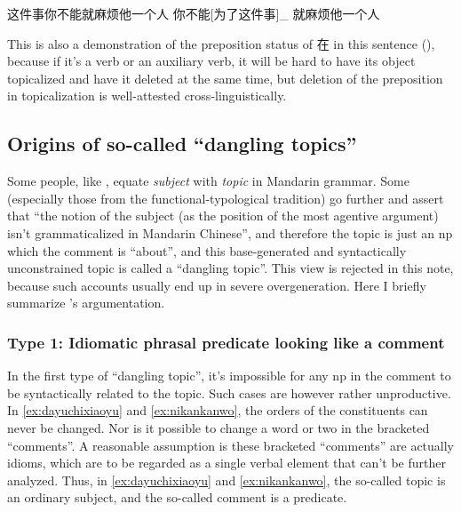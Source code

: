\documentclass[UTF8, a4paper, oneside, scheme=plain, 12pt]{ctexrep}
\newcommand*{\citesec}[1]{\S~{#1}}
\newcommand*{\term}[1]{\emph{#1}}
\begin{document}
\begin{exe}
    \ex\label{ex:zhejianshinibunengjiumafantayigeren} 这件事你不能就麻烦他一个人
    \ex 你不能[为了这件事]_{} 就麻烦他一个人
\end{exe}
This is also a demonstration of the preposition status of 在 in this sentence (),
because if it's a verb or an auxiliary verb,
it will be hard to have its object topicalized and have it deleted at the same time,
but deletion of the preposition in topicalization is well-attested cross-linguistically.

\subsection{Origins of so-called ``dangling topics''}\label{sec:topic-subject}

Some people, like \citet[\citesec{7.1}]{zhudexigrammar},
equate \term{subject} with \term{topic} in Mandarin grammar.
Some (especially those from the functional-typological tradition) go further 
and assert that ``the notion of the subject (as the position of the most agentive argument) 
isn't grammaticalized in Mandarin Chinese'',
and therefore the topic is just an \acs{np} which the comment is ``about'',
and this base-generated and syntactically unconstrained topic 
is called a ``dangling topic''.
This view is rejected in this note,
because such accounts usually end up in severe overgeneration. 
Here I briefly summarize \citet{sih2000topic}'s argumentation.

\subsubsection{Type 1: Idiomatic phrasal predicate looking like a comment}\label{sec:clause.dangling-topic.1}

In the first type of ``dangling topic'',
it's impossible for any \acs{np} in the comment to be syntactically related to the topic.
Such cases are however rather unproductive. 
In \eqref{ex:dayuchixiaoyu} and \eqref{ex:nikankanwo},
the orders of the constituents can never be changed.
Nor is it possible to change a word or two in the bracketed ``comments''.
A reasonable assumption is these bracketed ``comments''
are actually idioms, 
which are to be regarded as a single verbal element that can't be further analyzed.
Thus, in \eqref{ex:dayuchixiaoyu} and \eqref{ex:nikankanwo},
the so-called topic is an ordinary subject,
and the so-called comment is a predicate.
\end{document}
